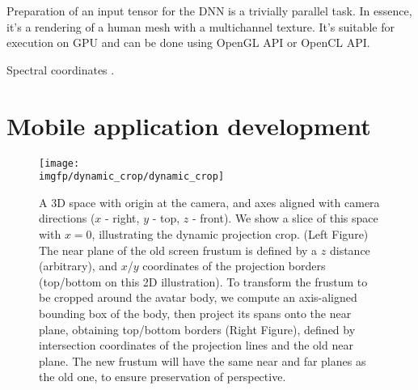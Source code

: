 Preparation of an input tensor for the DNN is a trivially parallel task. In essence, it's a rendering of a human mesh with a multichannel texture. It's suitable for execution on GPU and can be done using OpenGL API or OpenCL API.

Spectral coordinates \cite{aux:spectral10}.

\section{Mobile application development}
\label{methods:app}
\begin{figure}
	\centering
	\texttt{[image: \\imgfp/dynamic\_crop/dynamic\_crop]}
	\caption{A 3D space with origin at the camera, and axes aligned with camera directions ($x$ - right, $y$ - top, $z$ - front). We show a slice of this space with $x=0$, illustrating the dynamic projection crop. (Left Figure) The near plane of the old screen frustum is defined by a $z$ distance (arbitrary), and $x$/$y$ coordinates of the projection borders (top/bottom on this 2D illustration). To transform the frustum to be cropped around the avatar body, we compute an axis-aligned bounding box of the body, then project its spans onto the near plane, obtaining top/bottom borders (Right Figure), defined by intersection coordinates of the projection lines and the old near plane. The new frustum will have the same near and far planes as the old one, to ensure preservation of perspective.}
	\label{fig:dynamic_crop_math}
\end{figure}

